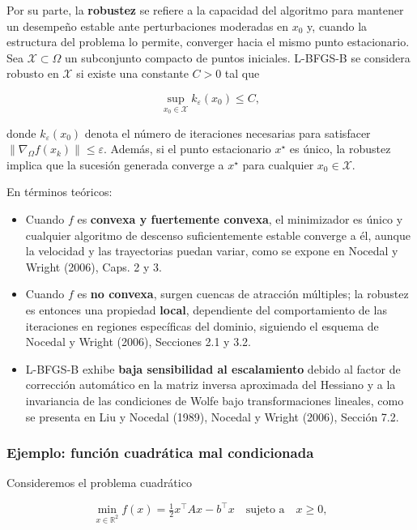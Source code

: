 \documentclass[
  spanish,
  us-letterpaper,
]{scrreprt}
\providecommand{\tightlist}{%
  \setlength{\itemsep}{0pt}\setlength{\parskip}{0pt}}
\numberwithin{equation}{section}
\begin{document}
Por su parte, la \textbf{robustez} se refiere a la capacidad del
algoritmo para mantener un desempeño estable ante perturbaciones
moderadas en \(x_0\) y, cuando la estructura del problema lo permite,
converger hacia el mismo punto estacionario. Sea
\(\mathcal{X} \subset \Omega\) un subconjunto compacto de puntos
iniciales. L-BFGS-B se considera robusto en \(\mathcal{X}\) si existe
una constante \(C > 0\) tal que

\[
\sup_{x_0 \in \mathcal{X}} k_\varepsilon (x_0) \le C,
\]

donde \(k_\varepsilon(x_0)\) denota el número de iteraciones necesarias
para satisfacer \(\|\nabla_{\Omega} f(x_k)\| \le \varepsilon\). Además,
si el punto estacionario \(x^\star\) es único, la robustez implica que
la sucesión generada converge a \(x^\star\) para cualquier
\(x_0 \in \mathcal{X}\).

En términos teóricos:

\begin{itemize}
\tightlist
\item
  Cuando \(f\) es \textbf{convexa y fuertemente convexa}, el minimizador
  es único y cualquier algoritmo de descenso suficientemente estable
  converge a él, aunque la velocidad y las trayectorias puedan variar,
  como se expone en Nocedal y Wright (2006), Caps. 2 y 3.
\item
  Cuando \(f\) es \textbf{no convexa}, surgen cuencas de atracción
  múltiples; la robustez es entonces una propiedad \textbf{local},
  dependiente del comportamiento de las iteraciones en regiones
  específicas del dominio, siguiendo el esquema de Nocedal y Wright
  (2006), Secciones 2.1 y 3.2.
\item
  L-BFGS-B exhibe \textbf{baja sensibilidad al escalamiento} debido al
  factor de corrección automático en la matriz inversa aproximada del
  Hessiano y a la invariancia de las condiciones de Wolfe bajo
  transformaciones lineales, como se presenta en Liu y Nocedal (1989),
  Nocedal y Wright (2006), Sección 7.2.
\end{itemize}

\subsubsection{Ejemplo: función cuadrática mal
condicionada}\label{ejemplo-funciuxf3n-cuadruxe1tica-mal-condicionada}

Consideremos el problema cuadrático

\[
\min_{x \in \mathbb{R}^2} f(x) = \tfrac{1}{2} x^\top A x - b^\top x
\quad \text{sujeto a} \quad x \ge 0,
\]
\end{document}
